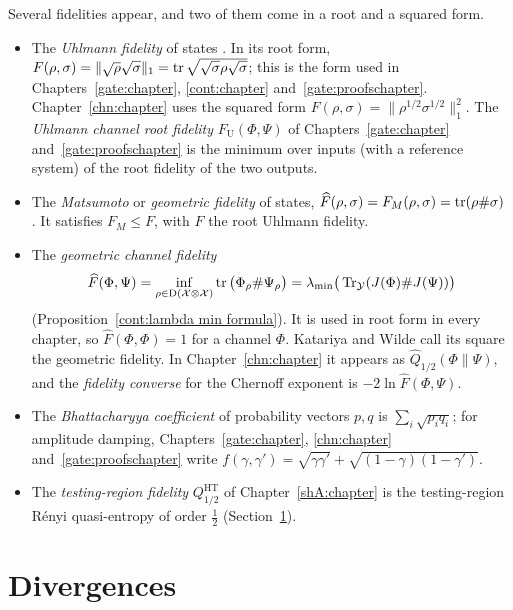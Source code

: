Several fidelities appear, and two of them come in a root and a squared form.
\begin{itemize}
\item The \emph{Uhlmann fidelity} of states \cite{Uhlmann1976}. In its root form, $F(\rho,\sigma)=\|\sqrt\rho\sqrt\sigma\|_1=\operatorname{tr}\sqrt{\sqrt\sigma\rho\sqrt\sigma}$; this is the form used in Chapters~\ref{gate:chapter}, \ref{cont:chapter} and~\ref{gate:proofschapter}. Chapter~\ref{chn:chapter} uses the squared form $F(\rho,\sigma)=\|\rho^{1/2}\sigma^{1/2}\|_1^2$. The \emph{Uhlmann channel root fidelity} $F_{\mathrm U}(\Phi,\Psi)$ of Chapters~\ref{gate:chapter} and~\ref{gate:proofschapter} is the minimum over inputs (with a reference system) of the root fidelity of the two outputs.
\item The \emph{Matsumoto} or \emph{geometric fidelity} of states, $\widehat F(\rho,\sigma)=F_M(\rho,\sigma)=\operatorname{tr}(\rho\#\sigma)$ \cite{matsumoto2010reverse,cree2020fidelity}. It satisfies $F_M\le F$, with $F$ the root Uhlmann fidelity.
\item The \emph{geometric channel fidelity}
\[
\widehat F(\Phi,\Psi)=\inf_{\rho\in\mathrm D(\mathcal X\otimes\mathcal X)}\operatorname{tr}\big(\Phi_\rho\#\Psi_\rho\big)=\lambda_{\min}\big(\operatorname{Tr}_{\mathcal Y}(J(\Phi)\#J(\Psi))\big)
\]
(Proposition~\ref{cont:lambda min formula}). It is used in root form in every chapter, so $\widehat F(\Phi,\Phi)=1$ for a channel $\Phi$. Katariya and Wilde \cite{KatariyaWilde2021} call its square the geometric fidelity. In Chapter~\ref{chn:chapter} it appears as $\widehat Q_{1/2}(\Phi\|\Psi)$, and the \emph{fidelity converse} for the Chernoff exponent is $-2\ln\widehat F(\Phi,\Psi)$.
\item The \emph{Bhattacharyya coefficient} of probability vectors $p,q$ is $\sum_i\sqrt{p_iq_i}$; for amplitude damping, Chapters~\ref{gate:chapter}, \ref{chn:chapter} and~\ref{gate:proofschapter} write $f(\gamma,\gamma')=\sqrt{\gamma\gamma'}+\sqrt{(1-\gamma)(1-\gamma')}$.
\item The \emph{testing-region fidelity} $Q^{\mathrm{HT}}_{1/2}$ of Chapter~\ref{shA:chapter} is the testing-region R\'enyi quasi-entropy of order $\frac12$ (Section~\ref{nt:sec:divergences}).
\end{itemize}

\section{Divergences}\label{nt:sec:divergences}

